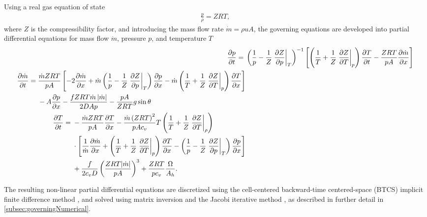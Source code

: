 Using a real gas equation of state
\begin{align}
    \frac{p}{\rho} = ZRT
,
\label{eq:equationOfState}
\end{align}
where $Z$ is the compressibility factor, and introducing the mass flow rate $\dot m = \rho u A$, the governing equations are developed into partial differential equations for mass flow $\dot m$, pressure $p$, and temperature $T$
{\allowdisplaybreaks %
\begin{align}
    \pdt{p} ={}& 
    \del{\frac{1}{p} - \frac{1}{Z} \eval{\dpd{Z}{p}}_T}^{-1}
    \sbr{
    \del{\frac{1}{T} + \frac{1}{Z}\eval{\dpd{Z}{T}}_p} \dpd{T}{t}
    - \frac{ZRT}{pA}\dpd{\dot m}{x}
    }
\label{eq:continuityEquation}
    \\
    \begin{split}
        \pdt{\dot m} ={}& \frac{\dot m ZRT}{pA} 
        \sbr{
            - 2\pdx{\dot m}
            + \dot m \del{\frac{1}{p} - \frac{1}{Z} \eval{\dpd{Z}{p}}_T} \pdx{p}
            - \dot m \del{\frac{1}{T} + \frac{1}{Z} \eval{\dpd{Z}{T}}_p} \pdx{T}
        }
        \\&
        {}- A\pdx{p}
        - \frac{fZRT \dot m \abs{\dot m}}{2DAp}
        - \frac{pA}{ZRT}g\sin\theta
    \end{split}
\label{eq:momentumEquation}
    \\
    \begin{split}
        \pdt{T} ={}&
        - \frac{\dot m ZRT}{pA}\pdx{T}
        - \frac{\dot m \del{ZRT}^2}{pAc_v}T \del{\frac{1}{T} + \frac{1}{Z}\eval{\dpd{Z}{T}}_\rho} \\
        &{}\times 
        \sbr{
            \frac{1}{\dot m}\dpd{\dot m}{x} 
            + \del{\frac{1}{T} + \frac{1}{Z}\eval{\dpd{Z}{T}}_p}\pdx{T}
            - \del{\frac{1}{p} - \frac{1}{Z}\eval{\dpd{Z}{p}}_T}\pdx{p}
        } \\
        &{}+ \frac{f}{2c_vD}\del{\frac{ZRT|\dot m|}{pA}}^3 
        + \frac{ZRT}{p c_v} \frac{\Omega}{A_h}
        .
    \end{split}
\label{eq:energyEquation}
\end{align}
}

The resulting non-linear partial differential equations are discretized using the cell-centered backward-time centered-space (BTCS) implicit finite difference method \cite{Kiuchi1993Implicit,Abbaspour2004Dynamic}, and solved using matrix inversion and the Jacobi iterative method \cite{Ferziger2002Computational}, as described in further detail in \cref{subsec:governingNumerical}.

